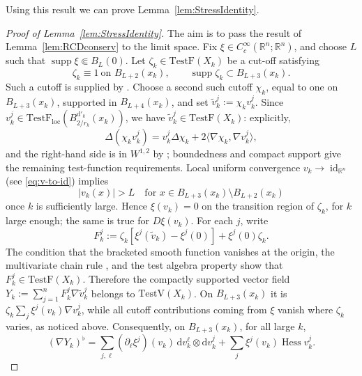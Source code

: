 \documentclass[12pt,a4paper,reqno]{amsart}
\newcommand{\TestF}{\mathrm{TestF}}
\newcommand{\TestV}{\mathrm{TestV}}
\begin{document}
Using this result we can prove Lemma~\ref{lem:StressIdentity}.

\begin{proof}[Proof of Lemma~\ref{lem:StressIdentity}]
The aim is to pass the result of Lemma~\ref{lem:RCDconserv} to the limit space. 
Fix
$\xi\in C_c^\infty(\mathbb R^n;\mathbb R^n)$, and choose $L$ such that
$\operatorname{supp}\xi\Subset B_L(0)$. Let $\zeta_k\in\TestF(X_k)$ be a cut-off satisfying
\[
 \zeta_k\equiv1\ \text{on }B_{L+2}(x_k),
 \qquad
 \operatorname{supp}\zeta_k\subset B_{L+3}(x_k).
\]
Such a cutoff is supplied by \cite[Lemma 3.1]{MondinoNaber}.
Choose a second such cutoff
$\chi_k$, equal to one on $B_{L+3}(x_k)$, supported in
$B_{L+4}(x_k)$, and set $\widetilde v_k^j:=\chi_kv_k^j$.  Since
$v_k^j\in\TestF_{\mathrm{loc}}(B_{2/r_k}^{\mathrm{d}'_k}(x_k))$, we have $\widetilde v_k^j\in\TestF(X_k)$: explicitly,
\[
 \Delta(\chi_kv_k^j)=v_k^j\Delta\chi_k
       +2\langle\nabla\chi_k,\nabla v_k^j\rangle,
\]
and the right-hand side is in $W^{1,2}$ by
\cite[Proposition 3.3.22]{GigliNDG}; boundedness and compact support give
the remaining test-function requirements.
Local uniform convergence $v_k\to\operatorname{id}_{\mathbb R^n}$ (see \eqref{eq:v-to-id}) implies
\[
 |v_k(x)|>L
 \quad\text{for }x\in
 B_{L+3}(x_k)\setminus B_{L+2}(x_k)
\]
once $k$ is sufficiently large. Hence $\xi(v_k)=0$ on the transition
region of $\zeta_k$, for $k$ large enough; the same is true for $D\xi(v_k)$.
For each $j$, write
\[
 F_k^j:=\zeta_k\left[\xi^j(\widetilde v_k)-\xi^j(0)\right]
          +\xi^j(0)\zeta_k.
\]
The condition that the bracketed smooth function vanishes at the origin,
the multivariate chain rule \cite[Lemma 3.1.4]{GigliNDG}, and the test
algebra property show that $F_k^j\in\TestF(X_k)$.  Therefore the compactly
supported vector field $
 Y_k:=\sum_{j=1}^nF_k^j\nabla\widetilde v_k^j$
belongs to $\TestV(X_k)$.  On $B_{L+3}(x_k)$ it is
$\zeta_k\sum_j\xi^j(v_k)\nabla v_k^j$, while all cutoff contributions coming from $\xi$
vanish where $\zeta_k$ varies, as noticed above.  Consequently, on $B_{L+3}(x_k)$, for all large $k$,
\begin{equation}
 (\nabla Y_k)^{\flat}
 =\sum_{j,\ell}(\partial_\ell\xi^j)(v_k)\,
       \mathrm{d}v_k^\ell\otimes \mathrm{d}v_k^j
   +\sum_j\xi^j(v_k)\operatorname{Hess}v_k^j.
 \label{eq:nabla-Xk}
\end{equation}


\end{proof}
\end{document}
